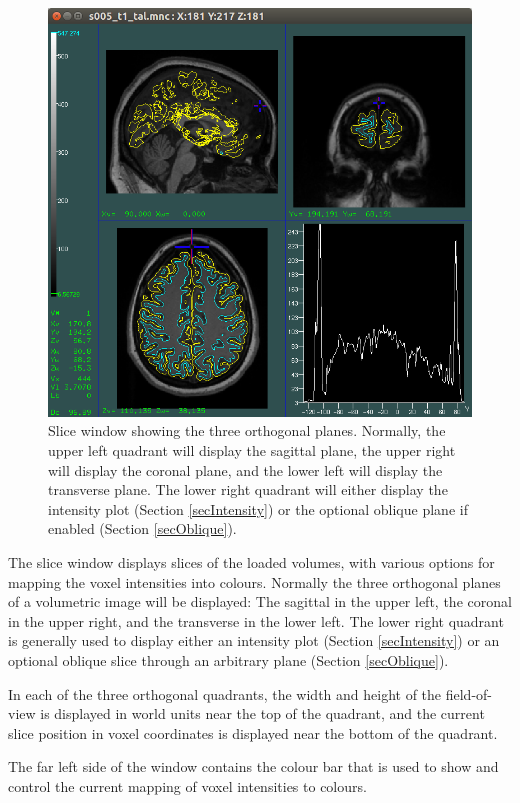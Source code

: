 \documentclass[11pt,letterpaper]{article}
\begin{document}
\begin{figure}
\centering
\includegraphics[width=0.8\linewidth]{display-slice.png}
\caption{Slice window showing the three orthogonal planes. Normally,
 the upper left quadrant will display the sagittal plane, the upper
 right will display the coronal plane, and the lower left will
 display the transverse plane. The lower right quadrant will either display
 the intensity plot (Section \ref{secIntensity}) or the optional oblique plane if enabled (Section \ref{secOblique}).}
\label{winSlice}
\end{figure}

The slice window displays slices of the loaded volumes, with various
options for mapping the voxel intensities into colours. Normally the
three orthogonal planes of a volumetric image will be displayed: The
sagittal in the upper left, the coronal in the upper right, and the
transverse in the lower left. The lower right quadrant is generally
used to display either an intensity plot (Section \ref{secIntensity})
or an optional oblique slice through an arbitrary plane (Section
\ref{secOblique}).

In each of the three orthogonal quadrants, the width and height of the
field-of-view is displayed in world units near the top of the
quadrant, and the current slice position in voxel coordinates is
displayed near the bottom of the quadrant.

The far left side of the window contains the colour bar that is used
to show and control the current mapping of voxel intensities to
colours. 
\end{document}
